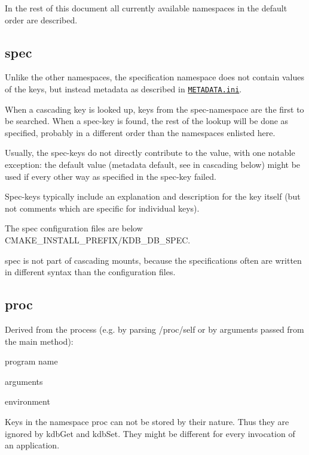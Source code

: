 In the rest of this document all currently available namespaces in the default order are described.

\subsection*{spec}

Unlike the other namespaces, the specification namespace does not contain values of the keys, but instead metadata as described in \href{/home/markus/Projekte/Elektra/current/doc/METADATA.ini}{\tt {\ttfamily M\+E\+T\+A\+D\+A\+T\+A.\+ini}}.

When a cascading key is looked up, keys from the spec-\/namespace are the first to be searched. When a spec-\/key is found, the rest of the lookup will be done as specified, probably in a different order than the namespaces enlisted here.

Usually, the spec-\/keys do not directly contribute to the value, with one notable exception\+: the default value (metadata {\ttfamily default}, see in cascading below) might be used if every other way as specified in the spec-\/key failed.

Spec-\/keys typically include an explanation and description for the key itself (but not comments which are specific for individual keys).

The spec configuration files are below {\ttfamily C\+M\+A\+K\+E\+\_\+\+I\+N\+S\+T\+A\+L\+L\+\_\+\+P\+R\+E\+F\+I\+X/\+K\+D\+B\+\_\+\+D\+B\+\_\+\+S\+P\+EC}.

spec is not part of cascading mounts, because the specifications often are written in different syntax than the configuration files.

\subsection*{proc}

Derived from the process (e.\+g. by parsing {\ttfamily /proc/self} or by arguments passed from the main method)\+:


\begin{DoxyItemize}
\item program name
\item arguments
\item environment
\end{DoxyItemize}

Keys in the namespace proc can not be stored by their nature. Thus they are ignored by {\ttfamily kdb\+Get} and {\ttfamily kdb\+Set}. They might be different for every invocation of an application.


